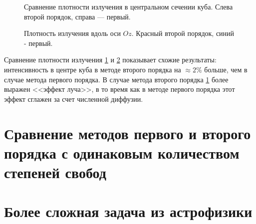 \begin{figure}[ht!]
\caption{Сравнение плотности излучения в центральном сечении куба. Слева второй порядок, справа --- первый.}
\label{fig:9}
\end{figure}

\begin{figure}[ht!]
\caption{Плотность излучения вдоль оси $Oz$. Красный второй порядок, синий - первый.}
\label{fig:10}
\end{figure}
Сравнение плотности излучения \ref{fig:9} и \ref{fig:10} показывает схожие результаты: интенсивность в центре куба в методе второго порядка на $\approx 2 \%$ больше, чем в случае метода первого порядка. В случае метода второго порядка \ref{fig:9} более выражен <<эффект луча>>, в то время как в методе первого порядка этот эффект сглажен за счет численной диффузии. 

\section{Сравнение методов первого и второго порядка с одинаковым количеством степеней свобод}
\section{Более сложная задача из астрофизики}
